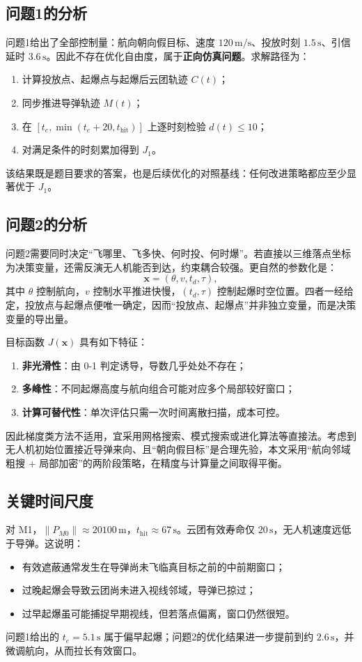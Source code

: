 \documentclass[withoutpreface,bwprint]{cumcmthesis}
\begin{document}
\subsection{问题1的分析}
问题1给出了全部控制量：航向朝向假目标、速度 $120\,\mathrm{m/s}$、投放时刻 $1.5\,\mathrm{s}$、引信延时 $3.6\,\mathrm{s}$。因此不存在优化自由度，属于\textbf{正向仿真问题}。求解路径为：
\begin{enumerate}
  \item 计算投放点、起爆点与起爆后云团轨迹 $C(t)$；
  \item 同步推进导弹轨迹 $M(t)$；
  \item 在 $[t_e,\min(t_e+20,t_{\mathrm{hit}})]$ 上逐时刻检验 $d(t)\le 10$；
  \item 对满足条件的时刻累加得到 $J_1$。
\end{enumerate}
该结果既是题目要求的答案，也是后续优化的对照基线：任何改进策略都应至少显著优于 $J_1$。

\subsection{问题2的分析}
问题2需要同时决定“飞哪里、飞多快、何时投、何时爆”。若直接以三维落点坐标为决策变量，还需反演无人机能否到达，约束耦合较强。更自然的参数化是：
\begin{equation}
\mathbf{x}=(\theta,v,t_d,\tau),
\end{equation}
其中 $\theta$ 控制航向，$v$ 控制水平推进快慢，$(t_d,\tau)$ 控制起爆时空位置。四者一经给定，投放点与起爆点便唯一确定，因而“投放点、起爆点”并非独立变量，而是决策变量的导出量。

目标函数 $J(\mathbf{x})$ 具有如下特征：
\begin{enumerate}
  \item \textbf{非光滑性}：由 0-1 判定诱导，导数几乎处处不存在；
  \item \textbf{多峰性}：不同起爆高度与航向组合可能对应多个局部较好窗口；
  \item \textbf{计算可替代性}：单次评估只需一次时间离散扫描，成本可控。
\end{enumerate}
因此梯度类方法不适用，宜采用网格搜索、模式搜索或进化算法等直接法。考虑到无人机初始位置接近导弹来向、且“朝向假目标”是合理先验，本文采用“航向邻域粗搜 + 局部加密”的两阶段策略，在精度与计算量之间取得平衡。

\subsection{关键时间尺度}
对 M1，$\|P_{M0}\|\approx 20100\,\mathrm{m}$，$t_{\mathrm{hit}}\approx 67\,\mathrm{s}$。云团有效寿命仅 $20\,\mathrm{s}$，无人机速度远低于导弹。这说明：
\begin{itemize}
  \item 有效遮蔽通常发生在导弹尚未飞临真目标之前的中前期窗口；
  \item 过晚起爆会导致云团尚未进入视线邻域，导弹已掠过；
  \item 过早起爆虽可能捕捉早期视线，但若落点偏离，窗口仍然很短。
\end{itemize}
问题1给出的 $t_e=5.1\,\mathrm{s}$ 属于偏早起爆；问题2的优化结果进一步提前到约 $2.6\,\mathrm{s}$，并微调航向，从而拉长有效窗口。
\end{document}
